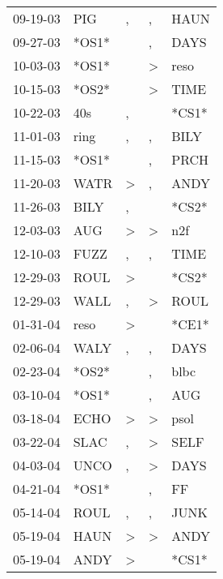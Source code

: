 \begin{supertabular}{lllll}
 09-19-03 &    PIG &                , &                , &   HAUN \\
 09-27-03 &  *OS1* &                  &                , &   DAYS \\
 10-03-03 &  *OS1* &                  &     \textgreater &   reso \\
 10-15-03 &  *OS2* &                  &     \textgreater &   TIME \\
 10-22-03 &    40s &                , &                  &  *CS1* \\
 11-01-03 &   ring &                , &                , &   BILY \\
 11-15-03 &  *OS1* &                  &                , &   PRCH \\
 11-20-03 &   WATR &     \textgreater &                , &   ANDY \\
 11-26-03 &   BILY &                , &                  &  *CS2* \\
 12-03-03 &    AUG &     \textgreater &     \textgreater &    n2f \\
 12-10-03 &   FUZZ &                , &                , &   TIME \\
 12-29-03 &   ROUL &     \textgreater &                  &  *CS2* \\
 12-29-03 &   WALL &                , &     \textgreater &   ROUL \\
 01-31-04 &   reso &     \textgreater &                  &  *CE1* \\
 02-06-04 &   WALY &                , &                , &   DAYS \\
 02-23-04 &  *OS2* &                  &                , &   blbc \\
 03-10-04 &  *OS1* &                  &                , &    AUG \\
 03-18-04 &   ECHO &     \textgreater &     \textgreater &   psol \\
 03-22-04 &   SLAC &                , &     \textgreater &   SELF \\
 04-03-04 &   UNCO &                , &     \textgreater &   DAYS \\
 04-21-04 &  *OS1* &                  &                , &     FF \\
 05-14-04 &   ROUL &                , &                , &   JUNK \\
 05-19-04 &   HAUN &     \textgreater &     \textgreater &   ANDY \\
 05-19-04 &   ANDY &     \textgreater &                  &  *CS1* \\

\end{supertabular}
